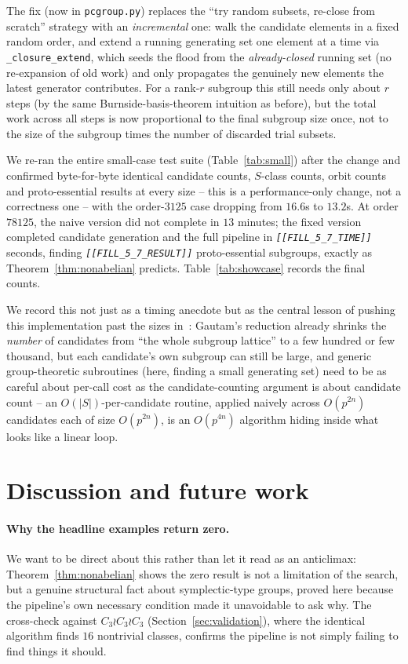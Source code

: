 \documentclass[11pt]{article}
\theoremstyle{remark}
\begin{document}
The fix (now in \texttt{pcgroup.py}) replaces the ``try random subsets,
re-close from scratch'' strategy with an \emph{incremental} one: walk the
candidate elements in a fixed random order, and extend a running generating
set one element at a time via \texttt{\_closure\_extend}, which seeds the
flood from the \emph{already-closed} running set (no re-expansion of old
work) and only propagates the genuinely new elements the latest generator
contributes. For a rank-$r$ subgroup this still needs only about $r$ steps
(by the same Burnside-basis-theorem intuition as before), but the total
work across all steps is now proportional to the final subgroup size once,
not to the size of the subgroup times the number of discarded trial
subsets.

We re-ran the entire small-case test suite (Table~\ref{tab:small}) after the
change and confirmed byte-for-byte identical candidate counts, $S$-class
counts, orbit counts and proto-essential results at every size -- this is a
performance-only change, not a correctness one -- with the order-$3125$ case
dropping from $16.6$s to $13.2$s. At order $78125$, the naive version did
not complete in $13$ minutes; the fixed version completed candidate
generation and the full pipeline in
\texttt{\emph{[[FILL\_5\_7\_TIME]]}} seconds, finding
\texttt{\emph{[[FILL\_5\_7\_RESULT]]}} proto-essential subgroups, exactly as
Theorem~\ref{thm:nonabelian} predicts. Table~\ref{tab:showcase} records the
final counts.

We record this not just as a timing anecdote but as the central lesson of
pushing this implementation past the sizes in~\cite{parkersemeraro}: Gautam's
reduction already shrinks the \emph{number} of candidates from ``the whole
subgroup lattice'' to a few hundred or few thousand, but each candidate's
own subgroup can still be large, and generic group-theoretic subroutines
(here, finding a small generating set) need to be as careful about per-call
cost as the candidate-counting argument is about candidate count -- an
$O(|S|)$-per-candidate routine, applied naively across $O(p^{2n})$
candidates each of size $O(p^{2n})$, is an $O(p^{4n})$ algorithm hiding
inside what looks like a linear loop.

\section{Discussion and future work}

\paragraph{Why the headline examples return zero.} We want to be direct
about this rather than let it read as an anticlimax: Theorem~\ref{thm:nonabelian}
shows the zero result is not a limitation of the search, but a genuine
structural fact about symplectic-type groups, proved here because the
pipeline's own necessary condition made it unavoidable to ask why. The
cross-check against $C_3 \wr C_3 \wr C_3$ (Section~\ref{sec:validation}),
where the identical algorithm finds $16$ nontrivial classes, confirms the
pipeline is not simply failing to find things it should.
\end{document}

